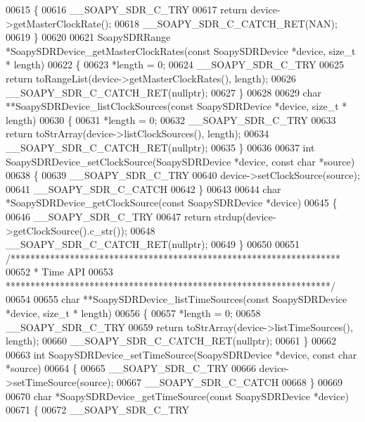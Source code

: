 \begin{DoxyCode}
00615 \{
00616     __SOAPY_SDR_C_TRY
00617     \textcolor{keywordflow}{return} device->getMasterClockRate();
00618     __SOAPY_SDR_C_CATCH_RET(NAN);
00619 \}
00620 
00621 SoapySDRRange *SoapySDRDevice_getMasterClockRates(\textcolor{keyword}{const} SoapySDRDevice *device, \textcolor{keywordtype}{size\_t} *
      length)
00622 \{
00623     *length = 0;
00624     __SOAPY_SDR_C_TRY
00625     \textcolor{keywordflow}{return} toRangeList(device->getMasterClockRates(), length);
00626     __SOAPY_SDR_C_CATCH_RET(\textcolor{keyword}{nullptr});
00627 \}
00628 
00629 \textcolor{keywordtype}{char} **SoapySDRDevice_listClockSources(\textcolor{keyword}{const} SoapySDRDevice *device, \textcolor{keywordtype}{size\_t} *
      length)
00630 \{
00631     *length = 0;
00632     __SOAPY_SDR_C_TRY
00633     \textcolor{keywordflow}{return} toStrArray(device->listClockSources(), length);
00634     __SOAPY_SDR_C_CATCH_RET(\textcolor{keyword}{nullptr});
00635 \}
00636 
00637 \textcolor{keywordtype}{int} SoapySDRDevice_setClockSource(SoapySDRDevice *device, \textcolor{keyword}{const} \textcolor{keywordtype}{char} *source)
00638 \{
00639     __SOAPY_SDR_C_TRY
00640     device->setClockSource(source);
00641     __SOAPY_SDR_C_CATCH
00642 \}
00643 
00644 \textcolor{keywordtype}{char} *SoapySDRDevice_getClockSource(\textcolor{keyword}{const} SoapySDRDevice *device)
00645 \{
00646     __SOAPY_SDR_C_TRY
00647     \textcolor{keywordflow}{return} strdup(device->getClockSource().c\_str());
00648     __SOAPY_SDR_C_CATCH_RET(\textcolor{keyword}{nullptr});
00649 \}
00650 
00651 \textcolor{comment}{/*******************************************************************}
00652 \textcolor{comment}{ * Time API}
00653 \textcolor{comment}{ ******************************************************************/}
00654 
00655 \textcolor{keywordtype}{char} **SoapySDRDevice_listTimeSources(\textcolor{keyword}{const} SoapySDRDevice *device, \textcolor{keywordtype}{size\_t} *
      length)
00656 \{
00657     *length = 0;
00658     __SOAPY_SDR_C_TRY
00659     \textcolor{keywordflow}{return} toStrArray(device->listTimeSources(), length);
00660     __SOAPY_SDR_C_CATCH_RET(\textcolor{keyword}{nullptr});
00661 \}
00662 
00663 \textcolor{keywordtype}{int} SoapySDRDevice_setTimeSource(SoapySDRDevice *device, \textcolor{keyword}{const} \textcolor{keywordtype}{char} *source)
00664 \{
00665     __SOAPY_SDR_C_TRY
00666     device->setTimeSource(source);
00667     __SOAPY_SDR_C_CATCH
00668 \}
00669 
00670 \textcolor{keywordtype}{char} *SoapySDRDevice_getTimeSource(\textcolor{keyword}{const} SoapySDRDevice *device)
00671 \{
00672     __SOAPY_SDR_C_TRY

\end{DoxyCode}
